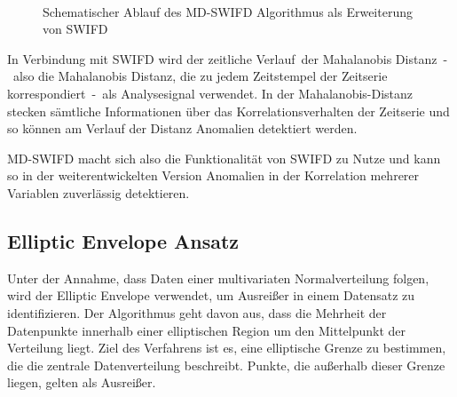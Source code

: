 \begin{figure}[t!]
    \caption{Schematischer Ablauf des MD-SWIFD Algorithmus als Erweiterung von SWIFD}
~\label{fig:md_swifd_schema}
\end{figure}

In Verbindung mit SWIFD wird der \glqq zeitliche Verlauf\grqq~der Mahalanobis Distanz~-~also die
Mahalanobis Distanz, die zu jedem Zeitstempel der Zeitserie korrespondiert~-~als Analysesignal verwendet. In der Mahalanobis-Distanz stecken sämtliche
Informationen über das Korrelationsverhalten der Zeitserie und so können am Verlauf der Distanz Anomalien detektiert werden.

MD-SWIFD macht sich also die Funktionalität von SWIFD zu Nutze und kann so in der weiterentwickelten Version Anomalien in der Korrelation mehrerer Variablen
zuverlässig detektieren.

\subsection{Elliptic Envelope Ansatz}
Unter der Annahme, dass Daten einer multivariaten Normalverteilung folgen, wird der Elliptic Envelope verwendet, um Ausreißer in einem Datensatz zu
identifizieren. Der Algorithmus geht davon aus, dass die Mehrheit der Datenpunkte innerhalb einer elliptischen Region um den Mittelpunkt der Verteilung
liegt. Ziel des Verfahrens ist es, eine elliptische Grenze zu bestimmen, die die zentrale Datenverteilung beschreibt. Punkte, die außerhalb dieser Grenze
liegen, gelten als Ausreißer.

